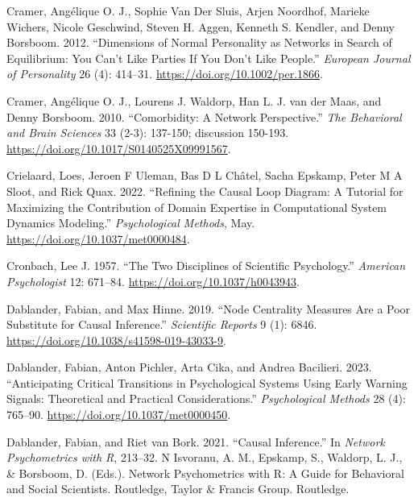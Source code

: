 \documentclass[
  a4paper,
  DIV=11,
  numbers=noendperiod,
  oneside]{scrreprt}
\newlength{\cslhangindent}
\newenvironment{CSLReferences}[2] %
 {\begin{list}{}{%
  \setlength{\itemindent}{0pt}
  \setlength{\leftmargin}{0pt}
  \setlength{\parsep}{0pt}
  \ifodd #1
   \setlength{\leftmargin}{\cslhangindent}
   \setlength{\itemindent}{-1\cslhangindent}
  \fi
  \setlength{\itemsep}{#2\baselineskip}}}
 {\end{list}}
\begin{document}
\begin{CSLReferences}{1}{0}
Cramer, Angélique O. J., Sophie Van Der Sluis, Arjen Noordhof, Marieke
Wichers, Nicole Geschwind, Steven H. Aggen, Kenneth S. Kendler, and
Denny Borsboom. 2012. {``Dimensions of Normal Personality as Networks in
Search of Equilibrium: You Can't Like Parties If You Don't Like
People.''} \emph{European Journal of Personality} 26 (4): 414--31.
\url{https://doi.org/10.1002/per.1866}.

Cramer, Angélique O. J., Lourens J. Waldorp, Han L. J. van der Maas, and
Denny Borsboom. 2010. {``Comorbidity: A Network Perspective.''}
\emph{The Behavioral and Brain Sciences} 33 (2-3): 137-150; discussion
150-193. \url{https://doi.org/10.1017/S0140525X09991567}.

Crielaard, Loes, Jeroen F Uleman, Bas D L Châtel, Sacha Epskamp, Peter M
A Sloot, and Rick Quax. 2022. {``Refining the Causal Loop Diagram: {A}
Tutorial for Maximizing the Contribution of Domain Expertise in
Computational System Dynamics Modeling.''} \emph{Psychological Methods},
May. \url{https://doi.org/10.1037/met0000484}.

Cronbach, Lee J. 1957. {``The Two Disciplines of Scientific
Psychology.''} \emph{American Psychologist} 12: 671--84.
\url{https://doi.org/10.1037/h0043943}.

Dablander, Fabian, and Max Hinne. 2019. {``Node Centrality Measures Are
a Poor Substitute for Causal Inference.''} \emph{Scientific Reports} 9
(1): 6846. \url{https://doi.org/10.1038/s41598-019-43033-9}.

Dablander, Fabian, Anton Pichler, Arta Cika, and Andrea Bacilieri. 2023.
{``Anticipating Critical Transitions in Psychological Systems Using
Early Warning Signals: Theoretical and Practical Considerations.''}
\emph{Psychological Methods} 28 (4): 765--90.
\url{https://doi.org/10.1037/met0000450}.

Dablander, Fabian, and Riet van Bork. 2021. {``Causal Inference.''} In
\emph{Network {Psychometrics} with {R}}, 213--32. N {Isvoranu}, {A}.
{M}., {Epskamp}, {S}., {Waldorp}, {L}. {J}., \& {Borsboom}, {D}.
({Eds}.). {Network} Psychometrics with {R}: {A} Guide for Behavioral and
Social Scientists. {Routledge}, {Taylor} \& {Francis Group}.
{Routledge}.


\end{CSLReferences}
\end{document}
